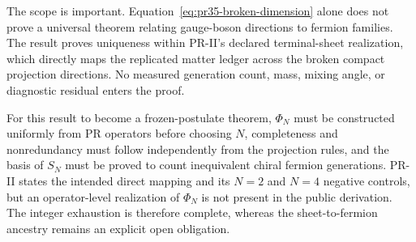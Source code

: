 The scope is important.  Equation~\eqref{eq:pr35-broken-dimension} alone does
not prove a universal theorem relating gauge-boson directions to fermion
families.  The result proves uniqueness within PR-II's declared terminal-sheet
realization, which directly maps the replicated matter ledger across the
broken compact projection directions.  No measured generation count, mass,
mixing angle, or diagnostic residual enters the proof.

For this result to become a frozen-postulate theorem, $\Phi_N$ must be
constructed uniformly from PR operators before choosing $N$, completeness and
nonredundancy must follow independently from the projection rules, and the
basis of $S_N$ must be proved to count inequivalent chiral fermion generations.
PR-II states the intended direct mapping and its $N=2$ and $N=4$ negative
controls, but an operator-level realization of $\Phi_N$ is not present in the
public derivation.  The integer exhaustion is therefore complete, whereas the
sheet-to-fermion ancestry remains an explicit open obligation.
